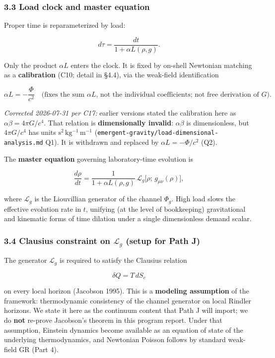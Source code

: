 \documentclass[
  11pt,
]{article}
\begin{document}
\subsubsection{3.3 Load clock and master
equation}\label{load-clock-and-master-equation}

Proper time is reparameterized by load:

\[
d\tau
=
\frac{dt}{1 + \alpha L(\rho,g)}.
\]

Only the product \(\alpha L\) enters the clock. It is fixed by on-shell
Newtonian matching as a \textbf{calibration} (C10; detail in §4.4), via
the weak-field identification

\[
\alpha L = -\frac{\Phi}{c^2}
\quad\text{(fixes the sum $\alpha L$, not the individual coefficients; not free derivation of $G$).}
\]

\emph{Corrected 2026-07-31 per C17:} earlier versions stated the
calibration here as \(\alpha\beta=4\pi G/c^4\). That relation is
\textbf{dimensionally invalid}: \(\alpha\beta\) is dimensionless, but
\(4\pi G/c^4\) has units \(\mathrm{s^2\,kg^{-1}\,m^{-1}}\)
(\texttt{emergent-gravity/load-dimensional-analysis.md} Q1). It is
withdrawn and replaced by \(\alpha L=-\Phi/c^2\) (Q2).

The \textbf{master equation} governing laboratory-time evolution is

\[
\frac{d\rho}{dt}
=
\frac{1}{1 + \alpha L(\rho,g)}
\,\mathcal{L}_g\bigl[\rho;\, g_{\mu\nu}(\rho)\bigr],
\]

where \(\mathcal{L}_g\) is the Liouvillian generator of the channel
\(\Phi_g\). High load slows the effective evolution rate in \(t\),
unifying (at the level of bookkeeping) gravitational and kinematic forms
of time dilation under a single dimensionless demand scalar.

\subsubsection{\texorpdfstring{3.4 Clausius constraint on
\(\mathcal{L}_g\) (setup for Path
J)}{3.4 Clausius constraint on \textbackslash mathcal\{L\}\_g (setup for Path J)}}\label{clausius-constraint-on-mathcall_g-setup-for-path-j}

The generator \(\mathcal{L}_g\) is required to satisfy the Clausius
relation

\[
\delta Q = T\, dS_c
\]

on every local horizon (Jacobson 1995). This is a \textbf{modeling
assumption} of the framework: thermodynamic consistency of the channel
generator on local Rindler horizons. We state it here as the continuum
content that Path J will import; we do \textbf{not} re-prove Jacobson's
theorem in this program report. Under that assumption, Einstein dynamics
become available as an equation of state of the underlying
thermodynamics, and Newtonian Poisson follows by standard weak-field GR
(Part 4).
\end{document}
